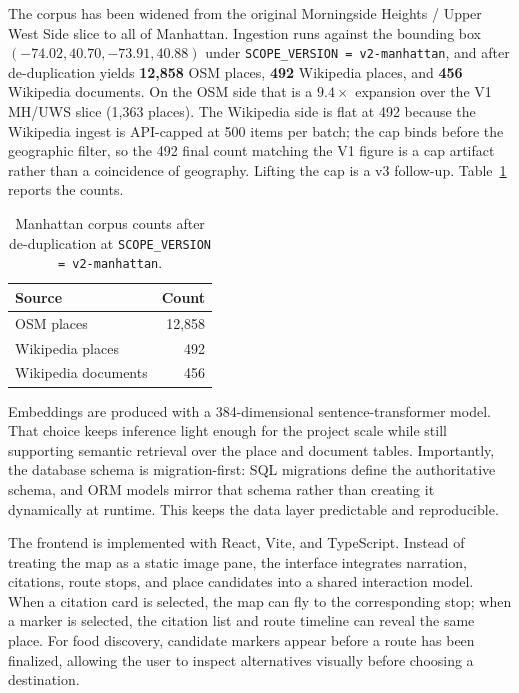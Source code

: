 \documentclass[sigconf,nonacm]{acmart}
\begin{document}
The corpus has been widened from the original Morningside Heights / Upper West Side slice to all of Manhattan. Ingestion runs against the bounding box \((-74.02, 40.70, -73.91, 40.88)\) under \texttt{SCOPE\_VERSION = v2-manhattan}, and after de-duplication yields \textbf{12{,}858} OSM places, \textbf{492} Wikipedia places, and \textbf{456} Wikipedia documents. On the OSM side that is a \(\mathbf{9.4\times}\) expansion over the V1 MH/UWS slice (1{,}363 places). The Wikipedia side is flat at 492 because the Wikipedia ingest is API-capped at 500 items per batch; the cap binds before the geographic filter, so the 492 final count matching the V1 figure is a cap artifact rather than a coincidence of geography. Lifting the cap is a v3 follow-up. Table~\ref{tab:corpus} reports the counts.

\begin{table}[h]
  \caption{Manhattan corpus counts after de-duplication at \texttt{SCOPE\_VERSION = v2-manhattan}.}
  \label{tab:corpus}
  \begin{tabular}{lr}
    \toprule
    Source & Count \\
    \midrule
    OSM places              & 12{,}858 \\
    Wikipedia places        & 492 \\
    Wikipedia documents     & 456 \\
    \bottomrule
  \end{tabular}
\end{table}

Embeddings are produced with a 384-dimensional sentence-transformer model. That choice keeps inference light enough for the project scale while still supporting semantic retrieval over the place and document tables. Importantly, the database schema is migration-first: SQL migrations define the authoritative schema, and ORM models mirror that schema rather than creating it dynamically at runtime. This keeps the data layer predictable and reproducible.

The frontend is implemented with React, Vite, and TypeScript. Instead of treating the map as a static image pane, the interface integrates narration, citations, route stops, and place candidates into a shared interaction model. When a citation card is selected, the map can fly to the corresponding stop; when a marker is selected, the citation list and route timeline can reveal the same place. For food discovery, candidate markers appear before a route has been finalized, allowing the user to inspect alternatives visually before choosing a destination.
\end{document}
